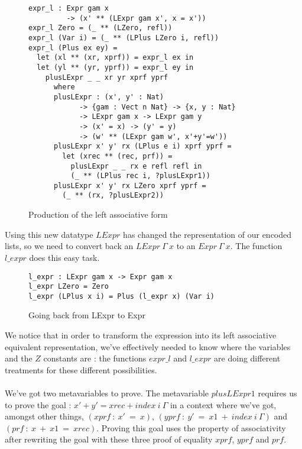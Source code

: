 \begin{figure}[H]
\figrule
\begin{center}
\begin{verbatim}
expr_l : Expr gam x 
         -> (x' ** (LExpr gam x', x = x'))
expr_l Zero = (_ ** (LZero, refl))
expr_l (Var i) = (_ ** (LPlus LZero i, refl))
expr_l (Plus ex ey) = 
  let (xl ** (xr, xprf)) = expr_l ex in
  let (yl ** (yr, yprf)) = expr_l ey in
    plusLExpr _ _ xr yr xprf yprf
      where 
      plusLExpr : (x', y' : Nat)
            -> {gam : Vect n Nat} -> {x, y : Nat} 
            -> LExpr gam x -> LExpr gam y 
            -> (x' = x) -> (y' = y) 
            -> (w' ** (LExpr gam w', x'+y'=w'))
      plusLExpr x' y' rx (LPlus e i) xprf yprf =
        let (xrec ** (rec, prf)) = 
          plusLExpr _ _ rx e refl refl in
          (_ ** (LPlus rec i, ?plusLExpr1))
      plusLExpr x' y' rx LZero xprf yprf =
        (_ ** (rx, ?plusLExpr2))
\end{verbatim}
\end{center}
\caption{Production of the left associative form}
\figrule
\end{figure}


Using this new datatype $LExpr$ has changed the representation of our encoded lists, so we need to convert back an $LExpr\ \Gamma\ x$ to an $Expr\ \Gamma\ x$. The function $l\_expr$ does this easy task.
\begin{figure}[H]
\figrule
\begin{center}
\begin{verbatim}
l_expr : LExpr gam x -> Expr gam x
l_expr LZero = Zero
l_expr (LPlus x i) = Plus (l_expr x) (Var i)
\end{verbatim}
\end{center}
\caption{Going back from LExpr to Expr}
\figrule
\end{figure}


We notice that in order to transform the expression into its left associative equivalent representation, we've effectively needed to know where the variables and the $Z$ constants are : the functions $expr\_l$ and $l\_expr$ are doing different treatments for these different possibilities. \\
\\
We've got two metavariables to prove. The metavariable $plusLExpr1$ requires us to prove the goal : $x' + y' = xrec + index\ i\ \Gamma$ in a context where we've got, amongst other things,  $(xprf\ :\ x'\ =\ x)$, $(yprf\ :\ y'\ =\ x1\ +\ index\ i\ \Gamma)$ and $(prf\ :\ x\ +\ x1\ =\ xrec)$.
Proving this goal uses the property of associativity after rewriting the goal with these three proof of equality $xprf$, $yprf$ and $prf$.

